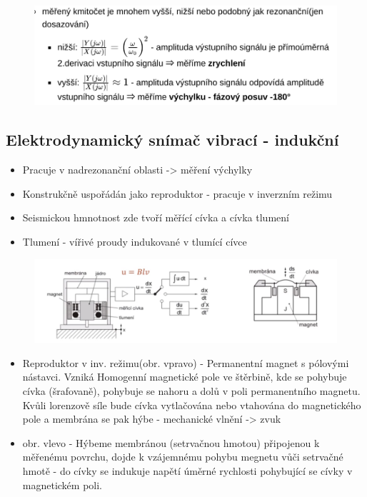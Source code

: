 \begin{figure}[h]
    \centering
    \includegraphics[scale = 0.5]{img/AbsVib1.png}
\end{figure}

\newpage

\subsection*{Elektrodynamický snímač vibrací - indukční}
\begin{itemize}
    \item Pracuje v nadrezonanční oblasti -> měření výchylky
    \item Konstrukčně uspořádán jako reproduktor - pracuje v inverzním režimu
    \item Seismickou hmnotnost zde tvoří měřící cívka a cívka tlumení
    \item Tlumení - vířivé proudy indukované v tlumící cívce
\end{itemize}

\begin{figure}[h]
    \centering
    \includegraphics[scale = 0.4]{img/elektrodynVIB.png}
\end{figure}

\begin{itemize}
    \item Reproduktor v inv. režimu(obr. vpravo) - Permanentní magnet s pólovými nástavci. Vzniká Homogenní magnetické pole ve štěrbině, kde se pohybuje cívka (šrafovaně), pohybuje se nahoru a dolů v poli permanentního magnetu. Kvůli lorenzově síle bude cívka vytlačována nebo vtahována do magnetického pole a membrána se pak hýbe - mechanické vlnění -> zvuk
    \item obr. vlevo - Hýbeme membránou (setrvačnou hmotou) připojenou k měřenému povrchu, dojde k vzájemnému pohybu megnetu vůči setrvačné hmotě - do cívky se indukuje napětí úměrné rychlosti pohybující se cívky v magnetickém poli.
\end{itemize}

